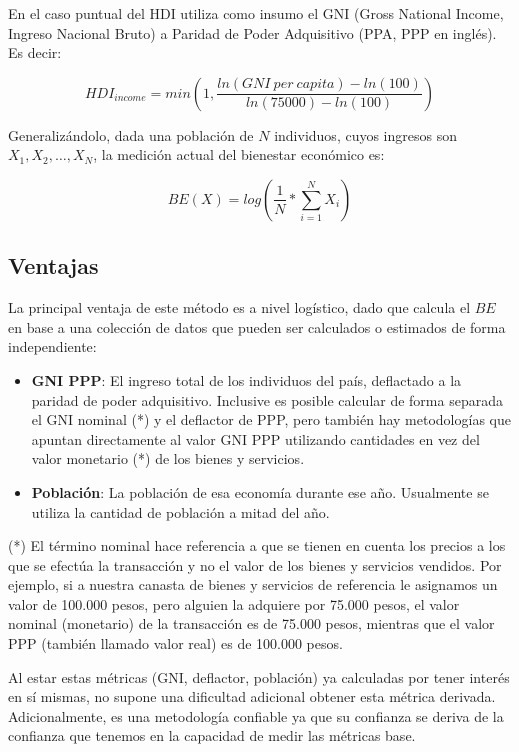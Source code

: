 En el caso puntual del HDI utiliza como insumo el GNI (Gross National Income, Ingreso Nacional Bruto) a Paridad de Poder Adquisitivo (PPA, PPP en inglés). Es decir:

$$
    HDI_{income} = min(1, \frac{ln(GNI\ per\ capita) - ln(100)}{ln(75000)-ln(100)})
$$

Generalizándolo, dada una población de $N$ individuos, cuyos ingresos son $X_1, X_2, \dots, X_N$, la medición actual del bienestar económico es:

$$
    BE(X) = log(\frac{1}{N} * \sum_{i=1}^{N}X_i)
$$

\subsection{Ventajas}

La principal ventaja de este método es a nivel logístico, dado que calcula el $BE$ en base a una colección de datos que pueden ser calculados o estimados de forma independiente:

\begin{itemize}
    \item \textbf{GNI PPP}: El ingreso total de los individuos del país, deflactado a la paridad de poder adquisitivo. Inclusive es posible calcular de forma separada el GNI nominal (*) y el deflactor de PPP, pero también hay metodologías que apuntan directamente al valor GNI PPP utilizando cantidades en vez del valor monetario (*) de los bienes y servicios. 
    \item \textbf{Población}: La población de esa economía durante ese año. Usualmente se utiliza la cantidad de población a mitad del año.
\end{itemize}

(*) El término nominal hace referencia a que se tienen en cuenta los precios a los que se efectúa la transacción y no el valor de los bienes y servicios vendidos. Por ejemplo, si a nuestra canasta de bienes y servicios de referencia le asignamos un valor de 100.000 pesos, pero alguien la adquiere por 75.000 pesos, el valor nominal (monetario) de la transacción es de 75.000 pesos, mientras que el valor PPP (también llamado valor real) es de 100.000 pesos.

Al estar estas métricas (GNI, deflactor, población) ya calculadas por tener interés en sí mismas, no supone una dificultad adicional obtener esta métrica derivada. Adicionalmente, es una metodología confiable ya que su confianza se deriva de la confianza que tenemos en la capacidad de medir las métricas base.

